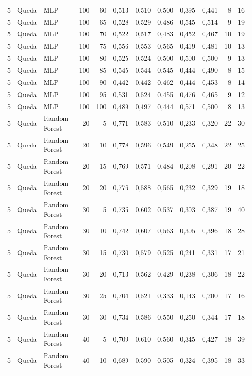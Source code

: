 \begin{longtable}{@{}rllrrrrrrrrr@{}}
5 & Queda & MLP & 100 & 60 & 0,513 & 0,510 & 0,500 & 0,395 & 0,441 & 8 & 16 \\
5 & Queda & MLP & 100 & 65 & 0,528 & 0,529 & 0,486 & 0,545 & 0,514 & 9 & 19 \\
5 & Queda & MLP & 100 & 70 & 0,522 & 0,517 & 0,483 & 0,452 & 0,467 & 10 & 19 \\
5 & Queda & MLP & 100 & 75 & 0,556 & 0,553 & 0,565 & 0,419 & 0,481 & 10 & 13 \\
5 & Queda & MLP & 100 & 80 & 0,525 & 0,524 & 0,500 & 0,500 & 0,500 & 9 & 13 \\
5 & Queda & MLP & 100 & 85 & 0,545 & 0,544 & 0,545 & 0,444 & 0,490 & 8 & 15 \\
5 & Queda & MLP & 100 & 90 & 0,442 & 0,442 & 0,462 & 0,444 & 0,453 & 8 & 14 \\
5 & Queda & MLP & 100 & 95 & 0,531 & 0,524 & 0,455 & 0,476 & 0,465 & 9 & 12 \\
5 & Queda & MLP & 100 & 100 & 0,489 & 0,497 & 0,444 & 0,571 & 0,500 & 8 & 13 \\
5 & Queda & Random Forest & 20 & 5 & 0,771 & 0,583 & 0,510 & 0,233 & 0,320 & 22 & 30 \\
5 & Queda & Random Forest & 20 & 10 & 0,778 & 0,596 & 0,549 & 0,255 & 0,348 & 22 & 25 \\
5 & Queda & Random Forest & 20 & 15 & 0,769 & 0,571 & 0,484 & 0,208 & 0,291 & 20 & 22 \\
5 & Queda & Random Forest & 20 & 20 & 0,776 & 0,588 & 0,565 & 0,232 & 0,329 & 19 & 18 \\
5 & Queda & Random Forest & 30 & 5 & 0,735 & 0,602 & 0,537 & 0,303 & 0,387 & 19 & 40 \\
5 & Queda & Random Forest & 30 & 10 & 0,742 & 0,607 & 0,563 & 0,305 & 0,396 & 18 & 28 \\
5 & Queda & Random Forest & 30 & 15 & 0,730 & 0,579 & 0,525 & 0,241 & 0,331 & 17 & 21 \\
5 & Queda & Random Forest & 30 & 20 & 0,713 & 0,562 & 0,429 & 0,238 & 0,306 & 18 & 22 \\
5 & Queda & Random Forest & 30 & 25 & 0,704 & 0,521 & 0,333 & 0,143 & 0,200 & 17 & 16 \\
5 & Queda & Random Forest & 30 & 30 & 0,734 & 0,586 & 0,550 & 0,250 & 0,344 & 17 & 18 \\
5 & Queda & Random Forest & 40 & 5 & 0,709 & 0,610 & 0,560 & 0,345 & 0,427 & 18 & 39 \\
5 & Queda & Random Forest & 40 & 10 & 0,689 & 0,590 & 0,505 & 0,324 & 0,395 & 18 & 33 \\

\end{longtable}

